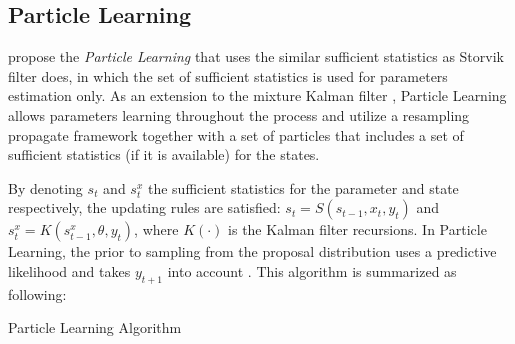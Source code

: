 \subsection{Particle Learning}

\cite{carvalho2010particle} propose the  \textit{Particle Learning} that uses the similar sufficient statistics as Storvik filter does, in which the set of sufficient statistics is used for parameters estimation only. As an extension to the mixture Kalman filter \citep{chen2000mixture}, Particle Learning allows parameters learning throughout the process and utilize a resampling propagate framework together with a set of particles that includes a set of sufficient statistics (if it is available) for the states. 

By denoting $s_t$ and $s_t^x$ the sufficient statistics for the parameter and state respectively, the updating rules are satisfied: $s_t=S(s_{t-1},x_t,y_t)$ and $s_t^x=K\left(s_{t-1}^x,\theta,y_t\right)$, where $K(\cdot)$ is the Kalman filter recursions. In Particle Learning, the prior to sampling from the proposal distribution uses a predictive likelihood and takes $y_{t+1}$ into account \citep{vieira2016online}. This algorithm is summarized as following: 

\begin{algorithm}[h]
\SetAlgoLined 
\caption{Particle Learning Algorithm}\label{algorithmPL}
\end{algorithm}

